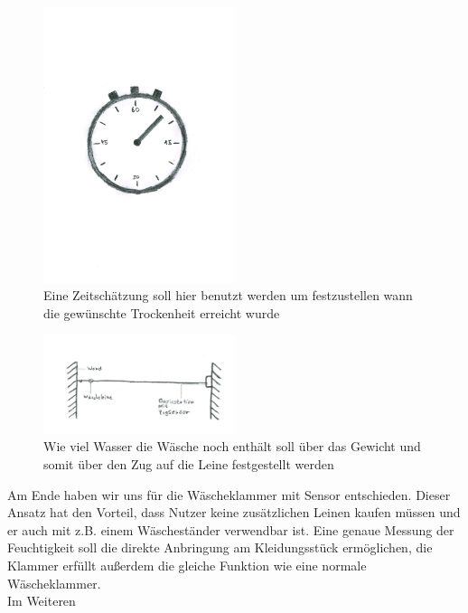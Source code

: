 \begin{figure}[htb] 
	\centerline{\includegraphics*[width=0.5\textwidth]{./10+10/Concept/06-zeit}}
	\caption{Eine Zeitschätzung soll hier benutzt werden um festzustellen wann die gewünschte Trockenheit erreicht wurde}
	\label{10+10_zeit}
\end{figure}
\begin{figure}[htb] 
	\centerline{\includegraphics*[width=0.5\textwidth]{./10+10/Concept/07-zug}}
	\caption{Wie viel Wasser die Wäsche noch enthält soll über das Gewicht und somit über den Zug auf die Leine festgestellt werden}
	\label{10+10_zug}
\end{figure}
\FloatBarrier
Am Ende haben wir uns für die Wäscheklammer mit Sensor entschieden. Dieser Ansatz hat den Vorteil, dass Nutzer keine zusätzlichen Leinen kaufen müssen und er auch mit z.B. einem Wäscheständer verwendbar ist. Eine genaue Messung der Feuchtigkeit soll die direkte Anbringung am Kleidungsstück ermöglichen, die Klammer erfüllt außerdem die gleiche Funktion wie eine normale Wäscheklammer.
\\ Im Weiteren 
